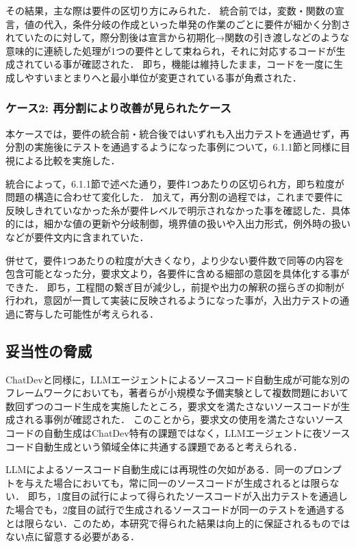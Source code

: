 \documentclass[submit,techrep,noauthor]{ipsj}
\begin{document}
その結果，主な際は要件の区切り方にみられた．
統合前では，変数・関数の宣言，値の代入，条件分岐の作成といった単発の作業のごとに要件が細かく分割されていたのに対して，際分割後は宣言から初期化→関数の引き渡しなどのような意味的に連続した処理が1つの要件として束ねられ，それに対応するコードが生成されている事が確認された．
即ち，機能は維持したまま，コードを一度に生成しやすいまとまりへと最小単位が変更されている事が角煮された．

\subsubsection{ケース2: 再分割により改善が見られたケース}
本ケースでは，要件の統合前・統合後ではいずれも入出力テストを通過せず，再分割の実施後にテストを通過するようになった事例について，6.1.1節と同様に目視による比較を実施した．

統合によって，6.1.1節で述べた通り，要件1つあたりの区切られ方，即ち粒度が問題の構造に合わせて変化した．
加えて，再分割の過程では，これまで要件に反映しきれていなかった糸が要件レベルで明示されなかった事を確認した．具体的には，細かな値の更新や分岐制御，境界値の扱いや入出力形式，例外時の扱いなどが要件文内に含まれていた．

併せて，要件1つあたりの粒度が大きくなり，より少ない要件数で同等の内容を包含可能となった分，要求文より，各要件に含める細部の意図を具体化する事ができた．
即ち，工程間の繋ぎ目が減少し，前提や出力の解釈の揺らぎの抑制が行われ，意図が一貫して実装に反映されるようになった事が，入出力テストの通過に寄与した可能性が考えられる．

\subsection{妥当性の脅威}
ChatDevと同様に，LLMエージェントによるソースコード自動生成が可能な別のフレームワークにおいて\cite{kiro}も，著者らが小規模な予備実験として複数問題において数回ずつのコード生成を実施したところ，要求文を満たさないソースコードが生成される事例が確認された．
このことから，要求文の使用を満たさないソースコードの自動生成はChatDev特有の課題ではなく，LLMエージェントに夜ソースコード自動生成という領域全体に共通する課題であると考えられる．

LLMによよるソースコード自動生成には再現性の欠如がある．同一のプロンプトを与えた場合においても，常に同一のソースコードが生成されるとは限らない．
即ち，1度目の試行によって得られたソースコードが入出力テストを通過した場合でも，2度目の試行で生成されるソースコードが同一のテストを通過するとは限らない．このため，本研究で得られた結果は向上的に保証されるものではない点に留意する必要がある．
\end{document}
